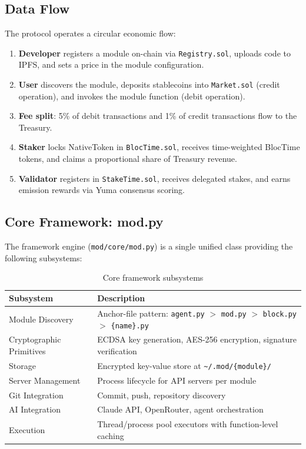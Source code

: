 \documentclass[11pt,a4paper]{article}
\begin{document}
\subsection{Data Flow}

The protocol operates a circular economic flow:

\begin{enumerate}
    \item \textbf{Developer} registers a module on-chain via \texttt{Registry.sol}, uploads code to IPFS, and sets a price in the module configuration.
    \item \textbf{User} discovers the module, deposits stablecoins into \texttt{Market.sol} (credit operation), and invokes the module function (debit operation).
    \item \textbf{Fee split}: 5\% of debit transactions and 1\% of credit transactions flow to the Treasury.
    \item \textbf{Staker} locks NativeToken in \texttt{BlocTime.sol}, receives time-weighted BlocTime tokens, and claims a proportional share of Treasury revenue.
    \item \textbf{Validator} registers in \texttt{StakeTime.sol}, receives delegated stakes, and earns emission rewards via Yuma consensus scoring.
\end{enumerate}

\subsection{Core Framework: mod.py}

The framework engine (\texttt{mod/core/mod.py}) is a single unified class providing the following subsystems:

\begin{table}[H]
\centering
\begin{tabularx}{\textwidth}{lX}
\toprule
\textbf{Subsystem} & \textbf{Description} \\
\midrule
Module Discovery & Anchor-file pattern: \texttt{agent.py} $>$ \texttt{mod.py} $>$ \texttt{block.py} $>$ \texttt{\{name\}.py} \\
Cryptographic Primitives & ECDSA key generation, AES-256 encryption, signature verification \\
Storage & Encrypted key-value store at \texttt{\textasciitilde/.mod/\{module\}/} \\
Server Management & Process lifecycle for API servers per module \\
Git Integration & Commit, push, repository discovery \\
AI Integration & Claude API, OpenRouter, agent orchestration \\
Execution & Thread/process pool executors with function-level caching \\
\bottomrule
\end{tabularx}
\caption{Core framework subsystems}
\end{table}
\end{document}
